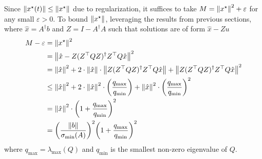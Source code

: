 \documentclass[12pt]{article}
\begin{document}
Since \({\left\lVert x^\star (t)\right\rVert} \leq {\left\lVert x^\star\right\rVert}\) due to regularization,
it suffices to take \(M = {\left\lVert x^\star\right\rVert}^2 + \varepsilon\)
for any small \(\varepsilon > 0\).
To bound \({\left\lVert x^\star\right\rVert}\),
leveraging the results from previous sections,
where \(\hat{x} = A^\dagger b\) and \(Z = I - A^\dagger A\)
such that solutions are of form \(\hat{x} - Z u\)
\begin{align*}
  M - \varepsilon &= {\left\lVert x^\star\right\rVert}^2 \\
    &= {\left\lVert\hat{x}-Z(Z^\top Q Z)^\dagger Z^\top Q \hat{x}\right\rVert}^2 \\
    &= {\left\lVert\hat{x}\right\rVert}^2
        + 2 \cdot {\left\lVert\hat{x}\right\rVert}
          \cdot {\left\lVert Z(Z^\top Q Z)^\dagger Z^\top Q \hat{x}\right\rVert}
        + {\left\lVert Z(Z^\top Q Z)^\dagger Z^\top Q \hat{x}\right\rVert}^2 \\
    &\leq {\left\lVert\hat{x}\right\rVert}^2
        + 2 \cdot {\left\lVert\hat{x}\right\rVert}^2
            \cdot {\left(\frac{q_{\max}}{q_{\min}}\right)}
        + {\left\lVert\hat{x}\right\rVert}^2
          \cdot {\left(\frac{q_{\max}}{q_{\min}}\right)}^2 \\
    &= {\left\lVert\hat{x}\right\rVert}^2
        \cdot {\left(1 + \frac{q_{\max}}{q_{\min}}\right)}^2 \\
    &= {\left(\frac{{\left\lVert b\right\rVert}}{\sigma_{\min} (A)}\right)}^2
        {\left(1 + \frac{q_{\max}}{q_{\min}}\right)}^2 \\
\end{align*}
where \(q_{\max} = \lambda_{\max} (Q)\)
and \(q_{\min}\) is the smallest non-zero eigenvalue of \(Q\).

\printbibliography
\end{document}

